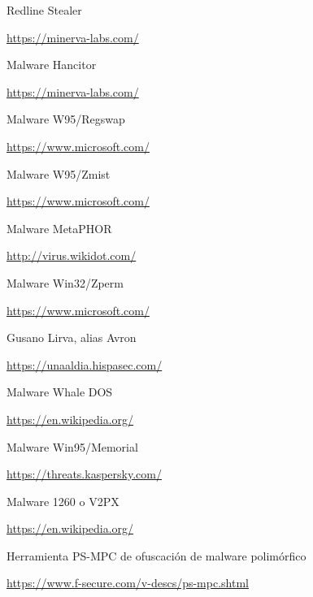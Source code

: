 \documentclass[15pt]{article}
\begin{document}
\begin{thebibliography}{40}
		Redline Stealer
		
		\href{https://minerva-labs.com/blog/redline-stealer-masquerades-as-telegram-installer/}{https://minerva-labs.com/}
		
		Malware Hancitor
		
		\href{https://minerva-labs.com/blog/hancitor-malware/}{https://minerva-labs.com/}
		
		Malware W95/Regswap
		
		\href{https://www.microsoft.com/en-us/wdsi/threats/malware-encyclopedia-description?Name=Virus:Win95/Regswap.1644.dr&threatId=-2147420803}{https://www.microsoft.com/}
		
		
		Malware W95/Zmist
		
		\href{https://www.microsoft.com/en-us/wdsi/threats/malware-encyclopedia-description?Name=Virus%3AWin95%2FZmist.A&ThreatID=-21474218163}{https://www.microsoft.com/}
		
		Malware MetaPHOR
		
		\href{http://virus.wikidot.com/metaphor}{http://virus.wikidot.com/}
		
		Malware Win32/Zperm
		
		\href{https://www.microsoft.com/en-us/wdsi/threats/malware-encyclopedia-description?Name=Virus:Win32/Zperm.A}{https://www.microsoft.com/}
		
		Gusano Lirva, alias Avron
		
		\href{https://unaaldia.hispasec.com/2003/01/versiones-del-gusano-lirva-alias-avril-avron-naith.html}{https://unaaldia.hispasec.com/}
		
		Malware Whale DOS
		
		\href{https://en.wikipedia.org/wiki/Whale_(computer_virus)}{https://en.wikipedia.org/}
		
		Malware Win95/Memorial
		
		\href{https://threats.kaspersky.com/mx/threat/Virus.Win9x.Memorial/}{https://threats.kaspersky.com/}
		
		Malware 1260 o V2PX
		
		\href{https://en.wikipedia.org/wiki/1260_(computer_virus)}{https://en.wikipedia.org/}
		
		Herramienta PS-MPC de ofuscación de malware polimórfico
		
		\href{https://www.f-secure.com/v-descs/ps-mpc.shtml}{https://www.f-secure.com/v-descs/ps-mpc.shtml}
		

\end{thebibliography}
\end{document}
